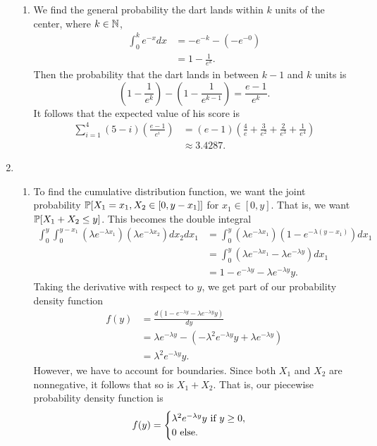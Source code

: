 \begin{enumerate}
\begin{enumerate}
        \item We find the general probability the dart lands within $k$ units of the center, where $k \in \N$,
        \begin{align*}
            \int_0^ke^{-x}dx &= -e^{-k} - (-e^{-0}) \\
                &= 1 - \frac{1}{e^k}.
        \end{align*}
        Then the probability that the dart lands in between $k - 1$ and $k$ units is
        \[
        \left(1 - \frac{1}{e^k}\right) - \left(1 - \frac{1}{e^{k - 1}}\right) = \frac{e - 1}{e^k}.
        \]
        It follows that the expected value of his score is
        \begin{align*}
            \sum\limits_{i = 1}^4(5 - i)\left(\frac{e - 1}{e^i}\right) &= (e - 1)\left(\frac{4}{e} + \frac{3}{e^2} + \frac{2}{e^3} + \frac{1}{e^4}\right) \\
            &\approx 3.4287.
        \end{align*}
    \end{enumerate}
    
    \item \begin{enumerate}
        \item To find the cumulative distribution function, we want the joint probability $\P[X_1 = x_1, X_2 \in [0, y - x_1]]$ for $x_1 \in [0, y]$. That is, we want $\P[X_1 + X_2 \leq y]$. This becomes the double integral
        \begin{align*}
            \int_0^y\int_0^{y - x_1}(\lambda e^{-\lambda x_1})(\lambda e^{-\lambda x_2})dx_2dx_1 &= \int_0^y(\lambda e^{-\lambda x_1})(1 - e^{-\lambda(y - x_1)})dx_1 \\
                &= \int_0^y(\lambda e^{-\lambda x_1} - \lambda e^{-\lambda y})dx_1\\
                &= 1 - e^{-\lambda y} - \lambda e^{-\lambda y}y.
        \end{align*}
        Taking the derivative with respect to $y$, we get part of our probability density function
        \begin{align*}
            f(y) &= \frac{d(1 - e^{-\lambda y} - \lambda e^{-\lambda y}y)}{dy} \\
                &= \lambda e^{-\lambda y} - (-\lambda^2e^{-\lambda y}y + \lambda e^{-\lambda y}) \\
                &= \lambda^2e^{-\lambda y}y.
        \end{align*}
        However, we have to account for boundaries. Since both $X_1$ and $X_2$ are nonnegative, it follows that so is $X_1 + X_2$. That is, our piecewise probability density function is
        \[
        f(y) =
        \begin{cases}
            \lambda^2e^{-\lambda y}y \f{ if } y \geq 0, \\
            0 \f{ else.}
        \end{cases}
        \]
        

\end{enumerate}
\end{enumerate}

